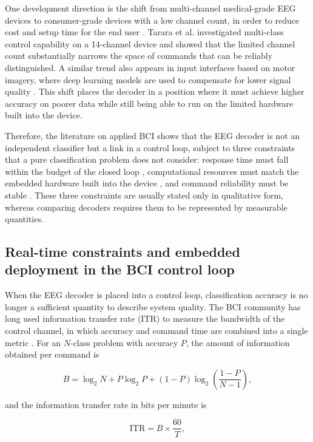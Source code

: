 One development direction is the shift from multi-channel
medical-grade EEG devices to consumer-grade devices with a low
channel count, in order to reduce cost and setup time for the end
user \cite{wu2022deepbrain}. Tarara et al. \cite{tarara2025motor}
investigated multi-class control capability on a 14-channel device
and showed that the limited channel count substantially narrows the
space of commands that can be reliably distinguished. A similar trend
also appears in input interfaces based on motor imagery, where deep
learning models are used to compensate for lower signal quality
\cite{paneru2025eeg}. This shift places the decoder in a position
where it must achieve higher accuracy on poorer data while still
being able to run on the limited hardware built into the device.

Therefore, the literature on applied BCI shows that the EEG decoder
is not an independent classifier but a link in a control loop,
subject to three constraints that a pure classification problem does
not consider: response time must fall within the budget of the
closed loop \cite{an2024development}, computational resources must
match the embedded hardware built into the device
\cite{wu2022deepbrain}, and command reliability must be stable
\cite{choi2023asynchronous}. These three constraints are usually
stated only in qualitative form, whereas comparing decoders requires
them to be represented by measurable quantities.

\subsection{Real-time constraints and embedded deployment in the BCI control loop}
\label{sec:rangbuoc}
When the EEG decoder is placed into a control loop, classification
accuracy is no longer a sufficient quantity to describe system
quality. The BCI community has long used information transfer rate
(ITR) to measure the bandwidth of the control channel, in which
accuracy and command time are combined into a single metric
\cite{wolpaw2002brain}. For an $N$-class problem with accuracy $P$,
the amount of information obtained per command is

\begin{equation}
\label{eq:itr-bits}
B = \log_2 N + P\log_2 P + (1-P)\log_2\!\left(\frac{1-P}{N-1}\right),
\end{equation}

and the information transfer rate in bits per minute is

\begin{equation}
\label{eq:itr-rate}
\mathrm{ITR} = B \times \frac{60}{T},
\end{equation}

